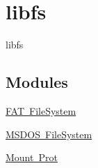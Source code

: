 \hypertarget{group__libfs}{}\section{libfs}
\label{group__libfs}


libfs  


\subsection*{Modules}
\begin{DoxyCompactItemize}
\item 
\mbox{\hyperlink{group__libfs__dosfs}{F\+A\+T File\+System}}
\item 
\mbox{\hyperlink{group__libfs__msdos}{M\+S\+D\+O\+S File\+System}}
\item 
\mbox{\hyperlink{group__libfs__nfsclient__mount__prot}{Mount Prot}}
\end{DoxyCompactItemize}
